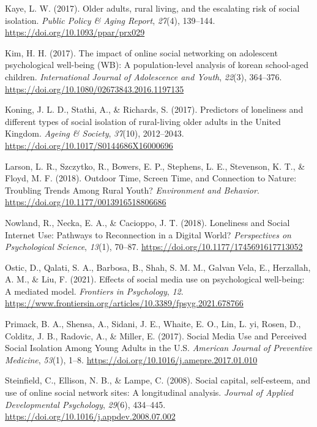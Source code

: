 \documentclass[
  letterpaper,
  DIV=11,
  numbers=noendperiod]{scrartcl}
\newlength{\cslhangindent}
\newenvironment{CSLReferences}[2] %
 {\begin{list}{}{%
  \setlength{\itemindent}{0pt}
  \setlength{\leftmargin}{0pt}
  \setlength{\parsep}{0pt}
  \ifodd #1
   \setlength{\leftmargin}{\cslhangindent}
   \setlength{\itemindent}{-1\cslhangindent}
  \fi
  \setlength{\itemsep}{#2\baselineskip}}}
 {\end{list}}
\begin{document}
\begin{CSLReferences}{1}{0}
Kaye, L. W. (2017). Older adults, rural living, and the escalating risk
of social isolation. \emph{Public Policy \& Aging Report}, \emph{27}(4),
139--144. \url{https://doi.org/10.1093/ppar/prx029}

Kim, H. H. (2017). The impact of online social networking on adolescent
psychological well-being (WB): A population-level analysis of korean
school-aged children. \emph{International Journal of Adolescence and
Youth}, \emph{22}(3), 364--376.
\url{https://doi.org/10.1080/02673843.2016.1197135}

Koning, J. L. D., Stathi, A., \& Richards, S. (2017). Predictors of
loneliness and different types of social isolation of rural-living older
adults in the United Kingdom. \emph{Ageing \& Society}, \emph{37}(10),
2012--2043. \url{https://doi.org/10.1017/S0144686X16000696}

Larson, L. R., Szczytko, R., Bowers, E. P., Stephens, L. E., Stevenson,
K. T., \& Floyd, M. F. (2018). Outdoor Time, Screen Time, and Connection
to Nature: Troubling Trends Among Rural Youth? \emph{Environment and
Behavior}. \url{https://doi.org/10.1177/0013916518806686}

Nowland, R., Necka, E. A., \& Cacioppo, J. T. (2018). Loneliness and
Social Internet Use: Pathways to Reconnection in a Digital World?
\emph{Perspectives on Psychological Science}, \emph{13}(1), 70--87.
\url{https://doi.org/10.1177/1745691617713052}

Ostic, D., Qalati, S. A., Barbosa, B., Shah, S. M. M., Galvan Vela, E.,
Herzallah, A. M., \& Liu, F. (2021). Effects of social media use on
psychological well-being: A mediated model. \emph{Frontiers in
Psychology}, \emph{12}.
\url{https://www.frontiersin.org/articles/10.3389/fpsyg.2021.678766}

Primack, B. A., Shensa, A., Sidani, J. E., Whaite, E. O., Lin, L. yi,
Rosen, D., Colditz, J. B., Radovic, A., \& Miller, E. (2017). Social
Media Use and Perceived Social Isolation Among Young Adults in the U.S.
\emph{American Journal of Preventive Medicine}, \emph{53}(1), 1--8.
\url{https://doi.org/10.1016/j.amepre.2017.01.010}

Steinfield, C., Ellison, N. B., \& Lampe, C. (2008). Social capital,
self-esteem, and use of online social network sites: A longitudinal
analysis. \emph{Journal of Applied Developmental Psychology},
\emph{29}(6), 434--445.
\url{https://doi.org/10.1016/j.appdev.2008.07.002}


\end{CSLReferences}
\end{document}
